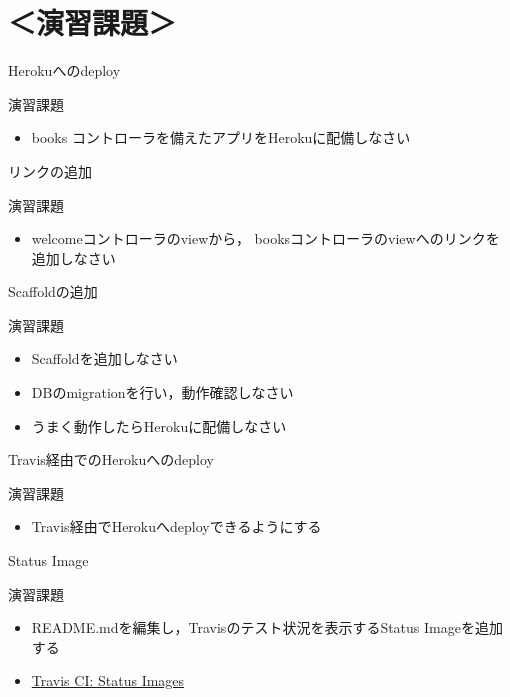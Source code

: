 \documentclass[t, aspectratio=169]{beamer}
\begin{document}
\section{＜演習課題＞}
\label{sec-7-4}
\begin{frame}[label=sec-7-4-1]{Herokuへのdeploy}
\begin{block}{演習課題}
\begin{itemize}
\item books コントローラを備えたアプリをHerokuに配備しなさい
\end{itemize}
\end{block}
\end{frame}
\begin{frame}[label=sec-7-4-2]{リンクの追加}
\begin{block}{演習課題}
\begin{itemize}
\item welcomeコントローラのviewから，
booksコントローラのviewへのリンクを追加しなさい
\end{itemize}
\end{block}
\end{frame}
\begin{frame}[label=sec-7-4-3]{Scaffoldの追加}
\begin{block}{演習課題}
\begin{itemize}
\item Scaffoldを追加しなさい
\item DBのmigrationを行い，動作確認しなさい
\item うまく動作したらHerokuに配備しなさい
\end{itemize}
\end{block}
\end{frame}
\begin{frame}[label=sec-7-4-4]{Travis経由でのHerokuへのdeploy}
\begin{block}{演習課題}
\begin{itemize}
\item Travis経由でHerokuへdeployできるようにする
\end{itemize}
\end{block}
\end{frame}
\begin{frame}[label=sec-7-4-5]{Status Image}
\begin{block}{演習課題}
\begin{itemize}
\item README.mdを編集し，Travisのテスト状況を表示するStatus Imageを追加する
\item \href{http://docs.travis-ci.com/user/status-images/}{Travis CI: Status Images}
\end{itemize}
\end{block}
\end{frame}
\end{document}

